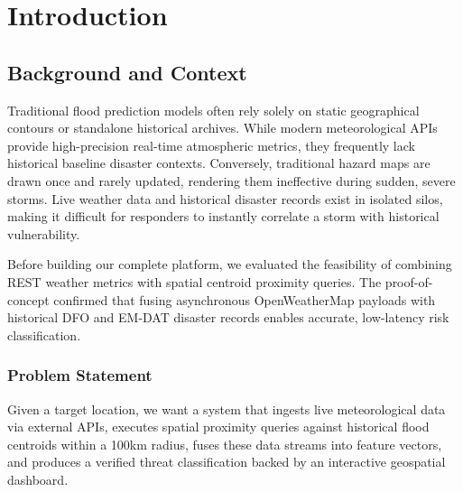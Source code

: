\documentclass[12pt,a4paper]{report}
\begin{document}
\newpage
\tableofcontents
\newpage

\chapter{Introduction}

\section{Background and Context}
Traditional flood prediction models often rely solely on static geographical contours or standalone historical archives. While modern meteorological APIs provide high-precision real-time atmospheric metrics, they frequently lack historical baseline disaster contexts. Conversely, traditional hazard maps are drawn once and rarely updated, rendering them ineffective during sudden, severe storms. Live weather data and historical disaster records exist in isolated silos, making it difficult for responders to instantly correlate a storm with historical vulnerability.

Before building our complete platform, we evaluated the feasibility of combining REST weather metrics with spatial centroid proximity queries. The proof-of-concept confirmed that fusing asynchronous OpenWeatherMap payloads with historical DFO and EM-DAT disaster records enables accurate, low-latency risk classification.

\subsection{Problem Statement}
Given a target location, we want a system that ingests live meteorological data via external APIs, executes spatial proximity queries against historical flood centroids within a 100km radius, fuses these data streams into feature vectors, and produces a verified threat classification backed by an interactive geospatial dashboard.
\end{document}
